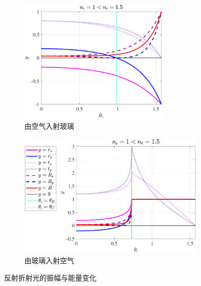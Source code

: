 \documentclass[UTF8]{report}
\theoremstyle{MyLineTheoremStyle} %
\theoremstyle{MyBlockTheoremStyle} %
\theoremstyle{MySubsubsectionStyle} %
\begin{document}
\newpage
\begin{figure}[H]\centering
\begin{subfigure}[t]{0.44\columnwidth}\centering
    \includegraphics[height=170pt]{assets/1,2/2024-09-21_12-26-37.pdf}
    \caption{ 由空气入射玻璃 }
\end{subfigure}
\begin{subfigure}[t]{0.54\columnwidth}\centering
    \includegraphics[height=170pt]{assets/1,2/2024-09-21_12-31-00.pdf}
    \caption{ 由玻璃入射空气 }
\end{subfigure}
\caption{ 反射折射光的振幅与能量变化 }
\label{反射折射光的振幅与能量变化}
\end{figure}
\end{document}
